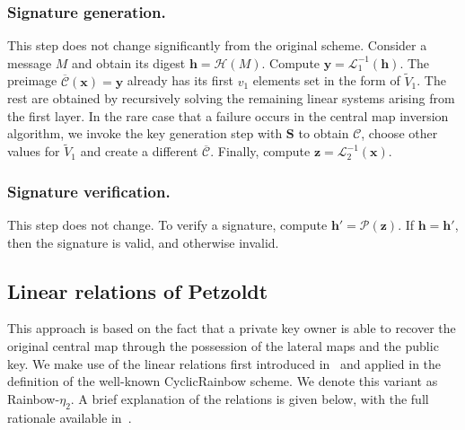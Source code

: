 \documentclass[12pt, a4paper, oneside]{memoir}
\theoremstyle{definition}
\begin{document}
\subsubsection{Signature generation.}

This step does not change significantly from the original scheme. Consider a message $M$ and obtain its digest $\mathbf{h} = \mathcal{H}(M)$. Compute $\mathbf{y} = \mathcal{L}_{1}^{-1}(\mathbf{h})$. The preimage $\overline{\mathcal{C}}(\mathbf{x}) = \mathbf{y}$ already has its first $v_{1}$ elements set in the form of $\widetilde{V}_{1}$. The rest are obtained by recursively solving the remaining linear systems arising from the first layer. In the rare case that a failure occurs in the central map inversion algorithm, we invoke the key generation step with $\mathbf{S}$ to obtain $\mathcal{C}$, choose other values for $\widetilde{V}_{1}$ and create a different $\overline{\mathcal{C}}$. Finally, compute $\mathbf{z} = \mathcal{L}_{2}^{-1}(\mathbf{x})$.

\subsubsection{Signature verification.}

This step does not change. To verify a signature, compute $\mathbf{h'} = \mathcal{P}(\mathbf{z})$. If $\mathbf{h} = \mathbf{h'}$, then the signature is valid, and otherwise invalid.

\subsection{Linear relations of Petzoldt}\label{subsec:linear}

This approach is based on the fact that a private key owner is able to recover the original central map through the possession of the lateral maps and the public key. We make use of the linear relations first introduced in~\cite{Petzoldt:201006} and applied in the definition of the well-known CyclicRainbow scheme. We denote this variant as Rainbow-$\eta_{2}$. A brief explanation of the relations is given below, with the full rationale available in~\cite[Chapter 7]{Petzoldt:201307}. 
\end{document}
